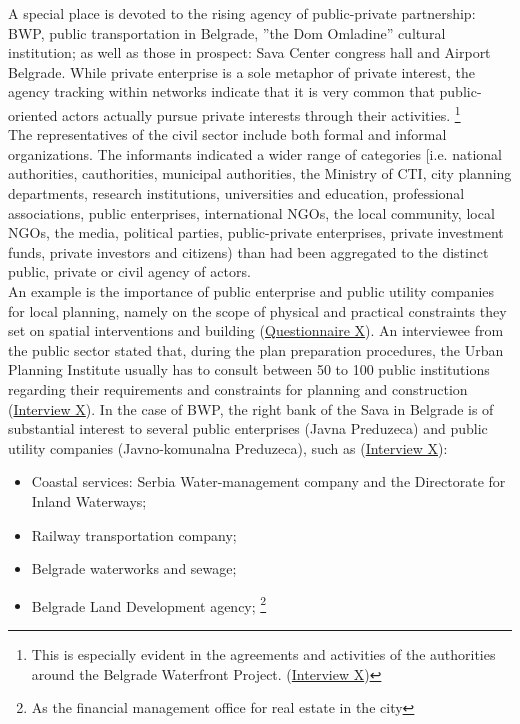 \documentclass[11pt]{report}
\begin{document}
A special place is devoted to the rising agency of public-private partnership: BWP, public transportation in Belgrade, ”the Dom Omladine” cultural institution; as well as those in prospect: Sava Center congress hall and Airport Belgrade. While private enterprise is a sole metaphor of private interest, the agency tracking within networks indicate that it is very common that public-oriented actors actually pursue private interests through their activities.
\footnote{This is especially evident in the agreements and activities of the authorities around the Belgrade Waterfront Project. (\href{InterviewX}{Interview X})}
\\

The representatives of the civil sector include both formal and informal organizations. The informants indicated a wider range of categories [i.e. national authorities, cauthorities, municipal authorities, the Ministry of CTI, city planning departments, research institutions, universities and education, professional associations, public enterprises, international NGOs, the local community, local NGOs, the media, political parties, public-private enterprises, private investment funds, private investors and citizens) than had been aggregated to the distinct public, private or civil agency of actors.
\\

An example is the importance of public enterprise and public utility companies for local planning, namely on the scope of physical and practical constraints they set on spatial interventions and building (\href{Questionnaire Experts Post-socialist}{Questionnaire X}).
An interviewee from the public sector stated that, during the plan preparation procedures, the Urban Planning Institute usually has to consult between 50 to 100 public institutions regarding their requirements and constraints for planning and construction (\href{InterviewX}{Interview X}).
In the case of BWP, the right bank of the Sava in Belgrade is of substantial interest to several public enterprises (Javna Preduzeca) and public utility companies (Javno-komunalna Preduzeca), such as (\href{InterviewX}{Interview X}):

\begin{itemize}
\item Coastal services: Serbia Water-management company and the Directorate for Inland Waterways;
\item Railway transportation company;
\item Belgrade waterworks and sewage;
\item Belgrade Land Development agency;
\footnote{As the financial management office for real estate in the city}
\end{itemize}
\end{document}

